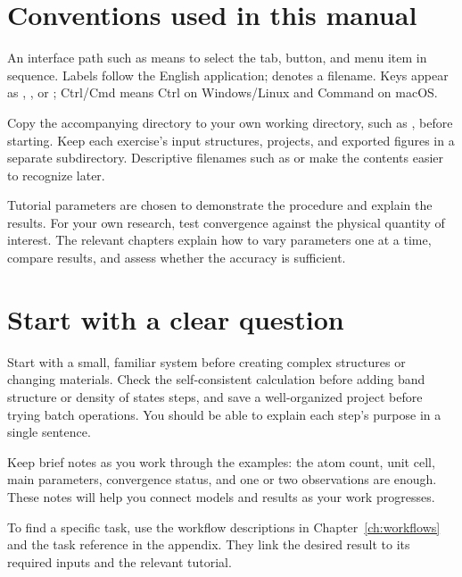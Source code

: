 \section{Conventions used in this manual}
An interface path such as  means to select the tab, button, and menu item in sequence. Labels follow the English application;  denotes a filename. Keys appear as , , or ; Ctrl/Cmd means Ctrl on Windows/Linux and Command on macOS.

Copy the accompanying  directory to your own working directory, such as , before starting. Keep each exercise's input structures, projects, and exported figures in a separate subdirectory. Descriptive filenames such as  or  make the contents easier to recognize later.

Tutorial parameters are chosen to demonstrate the procedure and explain the results. For your own research, test convergence against the physical quantity of interest. The relevant chapters explain how to vary parameters one at a time, compare results, and assess whether the accuracy is sufficient.

\section{Start with a clear question}
Start with a small, familiar system before creating complex structures or changing materials. Check the self-consistent calculation before adding band structure or density of states steps, and save a well-organized project before trying batch operations. You should be able to explain each step's purpose in a single sentence.

Keep brief notes as you work through the examples: the atom count, unit cell, main parameters, convergence status, and one or two observations are enough. These notes will help you connect models and results as your work progresses.

To find a specific task, use the workflow descriptions in Chapter~\ref{ch:workflows} and the task reference in the appendix. They link the desired result to its required inputs and the relevant tutorial.
